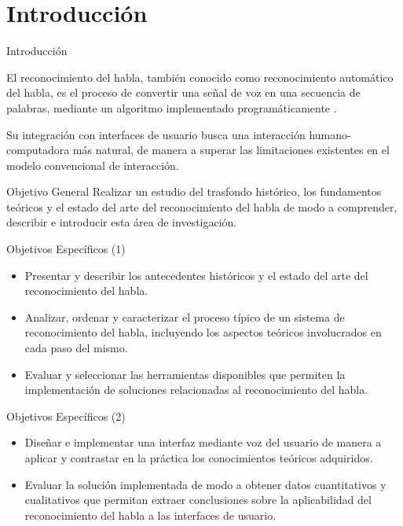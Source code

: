 \section{Introducci\'on}

\begin{frame}{Introducci\'on}

El reconocimiento del habla, tambi\'en conocido como reconocimiento autom\'atico del habla,
es el proceso de convertir una se\~nal de voz en una secuencia de
palabras, mediante un algoritmo implementado program\'aticamente \cite{JaisalAReview2012}. 

Su integraci\'on con interfaces de usuario busca una interacci\'on humano-computadora m\'as
natural, de manera a superar las limitaciones existentes en el modelo convencional
de interacci\'on.

\end{frame}

\begin{frame}{Objetivo General}
Realizar un estudio del trasfondo hist\'{o}rico, los fundamentos te\'{o}ricos 
y el estado del arte del reconocimiento del habla de modo a comprender, describir 
e introducir esta \'{a}rea de investigaci\'{o}n. 
\end{frame}

\begin{frame}{Objetivos Espec\'ificos (1)}

\begin{itemize}
    \item Presentar y describir los antecedentes hist\'oricos y el estado del arte del reconocimiento del habla.
    
    \item Analizar, ordenar y caracterizar el proceso t\'{i}pico de un sistema de reconocimiento del habla, 
        incluyendo los aspectos te\'{o}ricos involucrados en cada paso del mismo.

    \item Evaluar y seleccionar las herramientas disponibles que permiten la implementaci\'{o}n de soluciones 
        relacionadas al reconocimiento del habla.
\end{itemize}

\end{frame}

\begin{frame}{Objetivos Espec\'ificos (2)}

\begin{itemize}
    
    \item Dise\~{n}ar e implementar una interfaz mediante voz del usuario de manera a aplicar y 
    contrastar en la pr\'{a}ctica los conocimientos te\'{o}ricos adquiridos.
    
    \item Evaluar la soluci\'{o}n implementada de modo a obtener datos cuantitativos y cualitativos que 
        permitan extraer conclusiones sobre la aplicabilidad del reconocimiento del habla a las interfaces 
        de usuario.
\end{itemize}

\end{frame}
